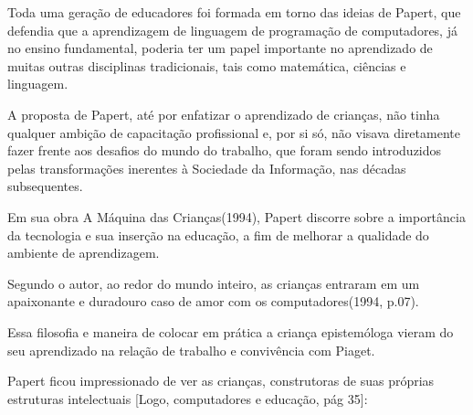 \documentclass[
12pt,		%
openright,	%
twoside,  %
a4paper,			%
chapter=TITLE,		%
english,			%
french,				%
spanish,			%
brazil				%
]{USPSC-classe/USPSC_RedarTex}
\begin{document}
Toda uma gera\c{c}\~ao de educadores foi formada em torno das ideias de Papert, que defendia que a aprendizagem de linguagem de programa\c{c}\~ao de computadores, j\'a no ensino fundamental, poderia ter um papel importante no aprendizado de muitas outras disciplinas tradicionais, tais como matem\'atica, ci\^encias e linguagem.








A proposta de Papert, at\'e por enfatizar o aprendizado de crian\c{c}as, n\~ao tinha qualquer ambi\c{c}\~ao de capacita\c{c}\~ao profissional e, por si s\'o, n\~ao visava diretamente fazer frente aos desafios do \textquotedbl mundo do trabalho\textquotedbl , que foram sendo introduzidos pelas transforma\c{c}\~oes inerentes \`a Sociedade da Informa\c{c}\~ao, nas d\'ecadas subsequentes.








Em sua obra \textquotedbl A M\'aquina das Crian\c{c}as\textquotedbl  (1994), Papert discorre sobre a import\^ancia da tecnologia e sua inser\c{c}\~ao na educa\c{c}\~ao, a fim de melhorar a qualidade do ambiente de aprendizagem.








Segundo o autor, \textquotedbl ao redor do mundo inteiro, as crian\c{c}as entraram em um apaixonante e duradouro caso de amor com os computadores\textquotedbl  (1994, p.07).








Essa filosofia e maneira de colocar em pr\'atica a crian\c{c}a epistem\'ologa vieram do seu aprendizado na rela\c{c}\~ao de trabalho e conviv\^encia com Piaget.








Papert ficou impressionado de ver as crian\c{c}as, construtoras de suas pr\'oprias estruturas intelectuais [Logo, computadores e educa\c{c}\~ao, p\'ag 35]:









\noindent\begin{center}\mbox{\centering{}}\end{center}
\end{document}
